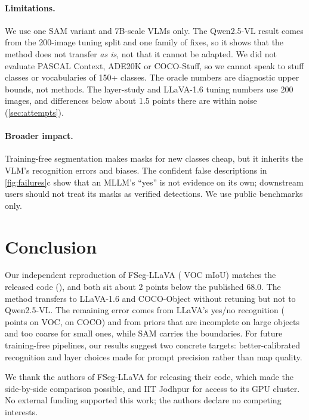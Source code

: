 \documentclass{article}
\newcommand{\method}{FSeg-LLaVA}
\newcommand{\miou}{mIoU}
\begin{document}
\paragraph{Limitations.} We use one SAM variant and 7B-scale VLMs only. The Qwen2.5-VL result comes
from the 200-image tuning split and one family of fixes, so it shows that the method does not transfer
\emph{as is}, not that it cannot be adapted. We did not evaluate PASCAL Context, ADE20K or COCO-Stuff,
so we cannot speak to stuff classes or vocabularies of 150+ classes. The oracle numbers are diagnostic
upper bounds, not methods. The layer-study and LLaVA-1.6 tuning numbers use 200 images, and
differences below about 1.5 points there are within noise (\cref{sec:attempts}).

\paragraph{Broader impact.} Training-free segmentation makes masks for new classes cheap, but it
inherits the VLM's recognition errors and biases. The confident false descriptions in
\cref{fig:failures}c show that an MLLM's ``yes'' is not evidence on its own; downstream users should
not treat its masks as verified detections. We use public benchmarks only.

\section{Conclusion}
\label{sec:conclusion}
Our independent reproduction of \method{} (\miouOurs{} VOC \miou{}) matches the released code
(\miouOfficial{}), and both sit about 2 points below the published 68.0. The method transfers to
LLaVA-1.6 and COCO-Object without retuning but not to Qwen2.5-VL. The remaining error comes from
LLaVA's yes/no recognition (\dOracle{} points on VOC, \dCocoOracle{} on COCO) and from priors that are
incomplete on large objects and too coarse for small ones, while SAM carries the boundaries. For
future training-free pipelines, our results suggest two concrete targets: better-calibrated recognition
and layer choices made for prompt precision rather than map quality.

\begin{ack}
We thank the authors of \method{} for releasing their code, which made the side-by-side comparison
possible, and IIT Jodhpur for access to its GPU cluster. No external funding supported this work; the
authors declare no competing interests.
\end{ack}
\end{document}
